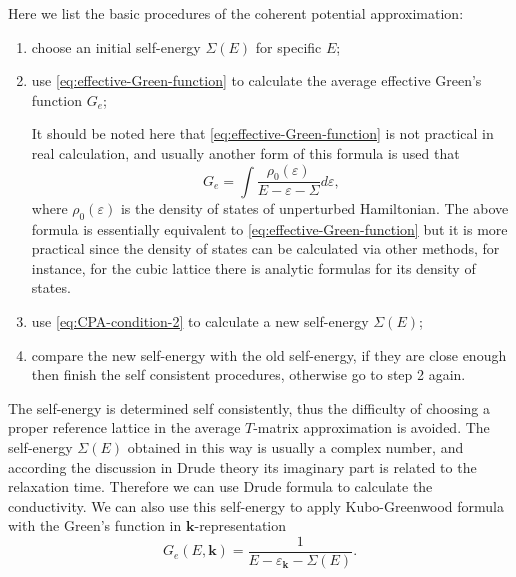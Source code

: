 \documentclass{book}
\numberwithin{equation}{section}
\begin{document}
Here we list the basic procedures of the coherent potential
approximation:
\begin{enumerate}[1.]\setlength{\itemsep}{0pt}
\item choose an initial self-energy $\Sigma(E)$ for specific $E$;
\item use \eqref{eq:effective-Green-function} to calculate the
  average effective Green's function $G_e$;

  It should be noted here that \eqref{eq:effective-Green-function} is
  not practical in real calculation, and usually another form of this
  formula is used that
  \begin{equation}
    \label{eq:effective-Green-function-DOS}
    G_e=\int\frac{\rho_0(\varepsilon)}{E-\varepsilon-\Sigma}d\varepsilon,
  \end{equation}
  where $\rho_0(\varepsilon)$ is the density of states of unperturbed
  Hamiltonian. The above formula is essentially equivalent to
  \eqref{eq:effective-Green-function} but it is more practical since
  the density of states can be calculated via other methods, for
  instance, for the cubic lattice there is analytic formulas for its
  density of states.
\item use \eqref{eq:CPA-condition-2} to calculate a new self-energy
  $\Sigma(E)$;
\item compare the new self-energy with the old self-energy, if they
  are close enough then finish the self consistent procedures,
  otherwise go to step 2 again.
\end{enumerate}

The self-energy is determined self consistently, thus the difficulty
of choosing a proper reference lattice in the average $T$-matrix
approximation is avoided. The self-energy $\Sigma(E)$ obtained in this
way is usually a complex number, and according the discussion in Drude
theory its imaginary part is related to the relaxation time. Therefore
we can use Drude formula to calculate the conductivity. We can also
use this self-energy to apply Kubo-Greenwood formula with the Green's
function in $\bm{k}$-representation
\begin{equation}
  G_e(E,\bm{k})=\frac{1}{E-\varepsilon_{\bm{k}}-\Sigma(E)}.
\end{equation}
\end{document}

